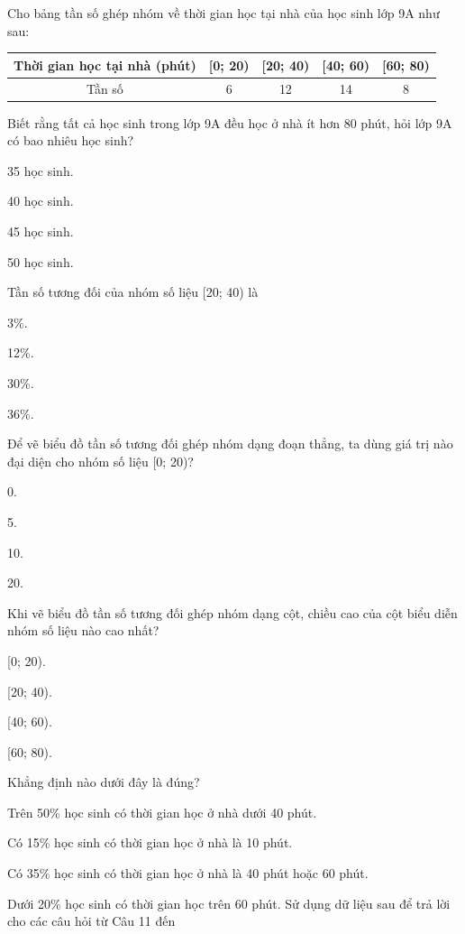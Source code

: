 \documentclass[%
    fontsize=12pt,%
    chapterprefix=false,%
    open=right,%
    twoside=false,%
    numbers=noenddot,%
    headings=optiontohead,%
    final,%
    DIV=15,%
    parskip=half %
]{scrbook}
\begin{document}
\begin{tracnghiem}
\item Cho bảng tần số ghép nhóm về thời gian học tại nhà của học sinh lớp 9A như sau: \begin{tabular}{|c|c|c|c|c|} \hline Thời gian học tại nhà (phút) & [0; 20) & [20; 40) & [40; 60) & [60; 80) \\ \hline Tần số & 6 & 12 & 14 & 8 \\ \hline \end{tabular}

\item Biết rằng tất cả học sinh trong lớp 9A đều học ở nhà ít hơn 80 phút, hỏi lớp 9A có bao nhiêu học sinh?
\begin{options}
  \item 35 học sinh.
  \item 40 học sinh.
  \item 45 học sinh.
  \item 50 học sinh.
\end{options}

\item Tần số tương đối của nhóm số liệu [20; 40) là
\begin{options}
  \item 3\%.
  \item 12\%.
  \item 30\%.
  \item 36\%.
\end{options}

\item Để vẽ biểu đồ tần số tương đối ghép nhóm dạng đoạn thẳng, ta dùng giá trị nào đại diện cho nhóm số liệu [0; 20)?
\begin{options}
  \item 0.
  \item 5.
  \item 10.
  \item 20.
\end{options}

\item Khi vẽ biểu đồ tần số tương đối ghép nhóm dạng cột, chiều cao của cột biểu diễn nhóm số liệu nào cao nhất?
\begin{options}
  \item [0; 20).
  \item [20; 40).
  \item [40; 60).
  \item [60; 80).
\end{options}

\item Khẳng định nào dưới đây là đúng?
\begin{options}
  \item Trên 50\% học sinh có thời gian học ở nhà dưới 40 phút.
  \item Có 15\% học sinh có thời gian học ở nhà là 10 phút.
  \item Có 35\% học sinh có thời gian học ở nhà là 40 phút hoặc 60 phút.
  \item Dưới 20\% học sinh có thời gian học trên 60 phút. Sử dụng dữ liệu sau để trả lời cho các câu hỏi từ Câu 11 đến
\end{options}


\end{tracnghiem}
\end{document}
